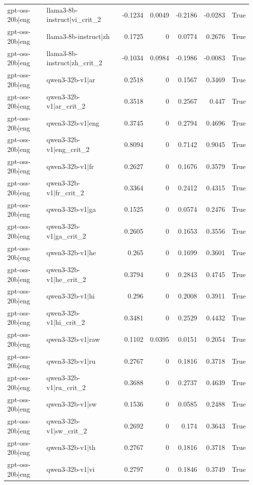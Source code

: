 \begin{table}
\begin{tabular}{l l r r r r l}
gpt-oss-20b|eng & llama3-8b-instruct|vi_crit_2 & -0.1234 & 0.0049 & -0.2186 & -0.0283 & True \\
gpt-oss-20b|eng & llama3-8b-instruct|zh & 0.1725 & 0 & 0.0774 & 0.2676 & True \\
gpt-oss-20b|eng & llama3-8b-instruct|zh_crit_2 & -0.1034 & 0.0984 & -0.1986 & -0.0083 & True \\
gpt-oss-20b|eng & qwen3-32b-v1|ar & 0.2518 & 0 & 0.1567 & 0.3469 & True \\
gpt-oss-20b|eng & qwen3-32b-v1|ar_crit_2 & 0.3518 & 0 & 0.2567 & 0.447 & True \\
gpt-oss-20b|eng & qwen3-32b-v1|eng & 0.3745 & 0 & 0.2794 & 0.4696 & True \\
gpt-oss-20b|eng & qwen3-32b-v1|eng_crit_2 & 0.8094 & 0 & 0.7142 & 0.9045 & True \\
gpt-oss-20b|eng & qwen3-32b-v1|fr & 0.2627 & 0 & 0.1676 & 0.3579 & True \\
gpt-oss-20b|eng & qwen3-32b-v1|fr_crit_2 & 0.3364 & 0 & 0.2412 & 0.4315 & True \\
gpt-oss-20b|eng & qwen3-32b-v1|ga & 0.1525 & 0 & 0.0574 & 0.2476 & True \\
gpt-oss-20b|eng & qwen3-32b-v1|ga_crit_2 & 0.2605 & 0 & 0.1653 & 0.3556 & True \\
gpt-oss-20b|eng & qwen3-32b-v1|he & 0.265 & 0 & 0.1699 & 0.3601 & True \\
gpt-oss-20b|eng & qwen3-32b-v1|he_crit_2 & 0.3794 & 0 & 0.2843 & 0.4745 & True \\
gpt-oss-20b|eng & qwen3-32b-v1|hi & 0.296 & 0 & 0.2008 & 0.3911 & True \\
gpt-oss-20b|eng & qwen3-32b-v1|hi_crit_2 & 0.3481 & 0 & 0.2529 & 0.4432 & True \\
gpt-oss-20b|eng & qwen3-32b-v1|raw & 0.1102 & 0.0395 & 0.0151 & 0.2054 & True \\
gpt-oss-20b|eng & qwen3-32b-v1|ru & 0.2767 & 0 & 0.1816 & 0.3718 & True \\
gpt-oss-20b|eng & qwen3-32b-v1|ru_crit_2 & 0.3688 & 0 & 0.2737 & 0.4639 & True \\
gpt-oss-20b|eng & qwen3-32b-v1|sw & 0.1536 & 0 & 0.0585 & 0.2488 & True \\
gpt-oss-20b|eng & qwen3-32b-v1|sw_crit_2 & 0.2692 & 0 & 0.174 & 0.3643 & True \\
gpt-oss-20b|eng & qwen3-32b-v1|th & 0.2767 & 0 & 0.1816 & 0.3718 & True \\
gpt-oss-20b|eng & qwen3-32b-v1|vi & 0.2797 & 0 & 0.1846 & 0.3749 & True \\

\end{tabular}
\end{table}
